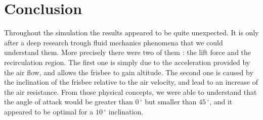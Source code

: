 \documentclass[10pt,a4paper]{report}
\begin{document}
\section{Conclusion}
Throughout the simulation the results appeared to be quite unexpected. It is only after a deep research trough fluid mechanics phenomena that we could understand them. More precisely there were two of them : the lift force and the recirculation region. The first one is simply due to the acceleration provided by the air flow, and allows the frisbee to gain altitude. The second one is caused by the inclination of the frisbee relative to the air velocity, and lead to an increase of the air resistance. From those physical concepts, we were able to understand that the angle of attack would be greater than $0\,^{\circ}$ but smaller than $45\,^{\circ}$, and it appeared to be optimal for a $10\,^{\circ}$ inclination.
\end{document}
